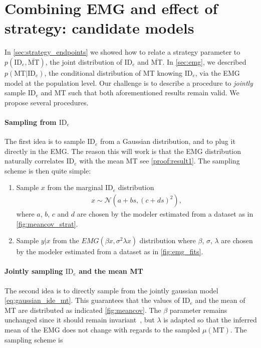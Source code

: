 \documentclass[12pt,a4paper]{article}
\newcommand{\mmt}{\ensuremath{\overline{\text{MT}}}\xspace}
\newcommand{\ide}{\ensuremath{{\text{ID}_e}}\xspace}
\begin{document}
\section{Combining EMG and effect of strategy: candidate models}
In \autoref{sec:strategy_endpoints} we showed how to relate a strategy parameter to $p(\ide, \mmt)$, the joint distribution of \ide and \mmt. In \autoref{sec:emg}, we described $p(\text{MT}| \ide)$, the conditional distribution of MT knowing \ide, via the EMG model at the population level. Our challenge is to describe a procedure to \textit{jointly} sample \ide and MT such that both aforementioned results remain valid.
We propose several procedures.

\paragraph{Sampling from \ide} The first idea is to sample \ide from a Gaussian distribution, and to plug it directly in the EMG. The reason this will work is that the EMG distribution naturally correlates \ide with the mean MT see \autoref{proof:result1}. The sampling scheme is then quite simple:
\begin{enumerate}
	\item Sample $x$ from the marginal \ide distribution
	      \begin{align}
		      x \sim \mathcal{N}(a + bs, (c+ds)^2),
	      \end{align}
	      where $a$, $b$, $c$ and $d$ are chosen by the modeler \eg estimated from a dataset as in \autoref{fig:meancov_strat}.
	\item Sample $y|x$ from the $EMG(\beta x, \sigma^2 \lambda x)$ distribution where $\beta$, $\sigma$, $\lambda$ are chosen by the modeler \eg estimated from a dataset as in \autoref{fig:emg_fits}.

\end{enumerate}

\paragraph{Jointly sampling \ide and the mean MT} The second idea is to directly sample from the jointly gaussian model \autoref{eq:gaussian_ide_mt}. This guarantees that the values of \ide and the mean of MT are distributed as indicated \autoref{fig:meancov}. The $\beta$ parameter remains unchanged since it should remain invariant~\cite{gori2018tochi,gori2017two}, but $\lambda$ is adapted so that the inferred mean of the EMG does not change with regards to the sampled $\mu(\text{MT})$. The sampling scheme is
\end{document}
